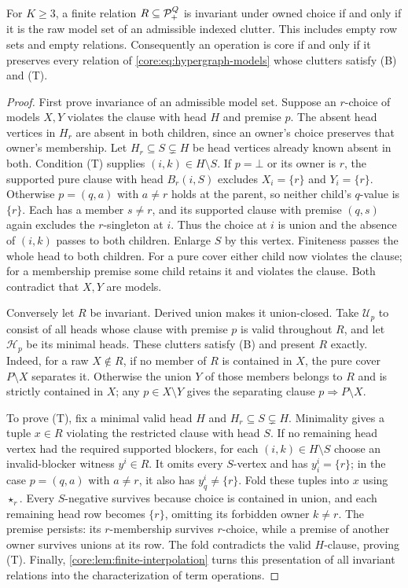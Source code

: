 \begin{theorem}
\label{core:thm:hypergraph-basis}
For $K\geq3$, a finite relation $R\subseteq\mathcal P_+^Q$ is invariant under owned
choice if and only if it is the raw model set of an admissible indexed
clutter. This includes empty row sets and empty relations. Consequently an
operation is core if and only if it preserves every relation of
\eqref{core:eq:hypergraph-models} whose clutters satisfy (B) and (T).
\end{theorem}
\begin{proof}
First prove invariance of an admissible model set. Suppose an $r$-choice
of models $X,Y$ violates the clause with head $H$ and premise $p$.
The absent head vertices in $H_r$ are absent in both children, since an
owner's choice preserves that owner's membership. Let
$H_r\subseteq S\subsetneq H$ be head vertices already known absent in
both. Condition (T) supplies $(i,k)\in H\setminus S$.
If $p=\bot$ or its owner is $r$, the supported pure clause with head
$B_r(i,S)$ excludes $X_i=\{r\}$ and $Y_i=\{r\}$.
Otherwise $p=(q,a)$ with $a\ne r$ holds at the parent, so neither child's
$q$-value is $\{r\}$. Each has a member $s\ne r$, and its supported
clause with premise $(q,s)$ again excludes the $r$-singleton at $i$.
Thus the choice at $i$ is union and the absence of $(i,k)$ passes to both
children. Enlarge $S$ by this vertex. Finiteness passes the whole head to
both children. For a pure cover either child now violates the clause;
for a membership premise some child retains it and violates the clause.
Both contradict that $X,Y$ are models.

Conversely let $R$ be invariant. Derived union makes it union-closed.
Take $\mathcal U_p$ to consist of all heads whose clause with premise $p$
is valid throughout $R$, and let $\mathcal H_p$ be its minimal heads.
These clutters satisfy (B) and present $R$ exactly. Indeed, for a raw
$X\notin R$, if no member of $R$ is contained in $X$, the pure cover
$P\setminus X$ separates it. Otherwise the union $Y$ of those members
belongs to $R$ and is strictly contained in $X$; any $p\in X\setminus Y$
gives the separating clause $p\Rightarrow P\setminus X$.

To prove (T), fix a minimal valid head $H$ and
$H_r\subseteq S\subsetneq H$. Minimality gives a tuple $x\in R$
violating the restricted clause with head $S$. If no remaining head vertex
had the required supported blockers, for each $(i,k)\in H\setminus S$
choose an invalid-blocker witness $y^i\in R$. It omits every $S$-vertex
and has $y^i_i=\{r\}$; in the case $p=(q,a)$ with $a\ne r$, it also has
$y^i_q\ne\{r\}$. Fold these tuples into $x$ using $\star_r$.
Every $S$-negative survives because choice is contained in union, and each
remaining head row becomes $\{r\}$, omitting its forbidden owner $k\ne r$.
The premise persists: its $r$-membership survives $r$-choice, while a
premise of another owner survives unions at its row. The fold contradicts
the valid $H$-clause, proving (T). Finally,
\cref{core:lem:finite-interpolation} turns this presentation of all invariant
relations into the characterization of term operations.
\end{proof}

